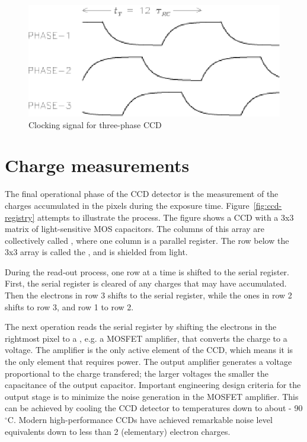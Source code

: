 \begin{figure}[h]
  \centering
	\includegraphics{CCD_clocking.eps}
  \caption{Clocking signal for three-phase CCD}
  \label{CCD.figclocking}
\end{figure}


\section{Charge measurements} 

The final operational phase of the CCD detector is the measurement of
the charges accumulated in the pixels during the exposure
time. Figure~\ref{fig:ccd-registry} attempts to illustrate the process. The
figure shows a CCD with a 3x3 matrix of light-sensitive MOS capacitors. The
columns of this array are collectively called , where
one column is a parallel register. The row below the 3x3 array is called the
, and is shielded from light.

During the read-out
process, one row at a time is shifted to the serial register. First, the serial
register is cleared of any charges that may have accumulated. Then the electrons in
row 3 shifts to the serial register, while the ones in row 2 shifts to row 3,
and row 1 to row 2.

The next operation reads the serial register by shifting the
electrons in the rightmost pixel to a , e.g. a MOSFET
amplifier, that
converts the charge to a voltage. The amplifier is the only active element of
the CCD, which means it is the only element that requires power.
The output amplifier generates a voltage proportional to the charge
transfered; the larger voltages the smaller the capacitance of the
output capacitor. Important engineering design criteria for the output
stage is to minimize the noise generation in the MOSFET
amplifier. This can be achieved by cooling the CCD detector to
temperatures down to about - 90$^\circ$C.  Modern
high-performance CCDs have achieved remarkable noise level
equivalents down to less than 2 (elementary) electron charges.

